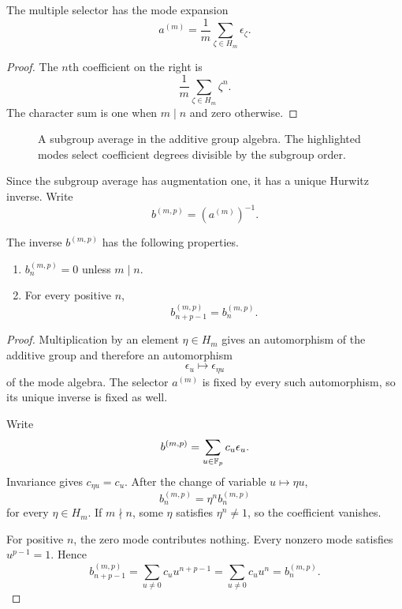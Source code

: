 \begin{histlemma}\label{hist:lem:subgroup_average}
The multiple selector has the mode expansion
\[
\boxed{
a^{(m)}
=
\frac1m
\sum_{\zeta\in H_m}
\epsilon_\zeta.
}
\]
\end{histlemma}

\begin{proof}
The \(n\)th coefficient on the right is
\[
\frac1m
\sum_{\zeta\in H_m}\zeta^n.
\]
The character sum is one when \(m\mid n\) and zero otherwise.
\end{proof}

\begin{figure}[t]
\centering
{}
\caption{A subgroup average in the additive group algebra. The highlighted modes select coefficient degrees divisible by the subgroup order.}
\label{hist:fig:subgroup_average}
\end{figure}

Since the subgroup average has augmentation one, it has a unique Hurwitz inverse. Write
\[
b^{(m,p)}
=
(a^{(m)})^{-1}.
\]

\begin{histtheorem}\label{hist:thm:support_period}
The inverse \(b^{(m,p)}\) has the following properties.
\begin{enumerate}
\item \(b_n^{(m,p)}=0\) unless \(m\mid n\).
\item For every positive \(n\),
\[
\boxed{
b_{n+p-1}^{(m,p)}
=
b_n^{(m,p)}.
}
\]
\end{enumerate}
\end{histtheorem}

\begin{proof}
Multiplication by an element \(\eta\in H_m\) gives an automorphism of the additive group and therefore an automorphism
\[
\epsilon_u\longmapsto\epsilon_{\eta u}
\]
of the mode algebra. The selector \(a^{(m)}\) is fixed by every such automorphism, so its unique inverse is fixed as well.

Write
\[
b^{(m,p)}
=
\sum_{u\in\mathbb F_p}c_u\epsilon_u.
\]
Invariance gives \(c_{\eta u}=c_u\). After the change of variable \(u\mapsto\eta u\),
\[
b_n^{(m,p)}
=
\eta^n b_n^{(m,p)}
\]
for every \(\eta\in H_m\). If \(m\nmid n\), some \(\eta\) satisfies \(\eta^n\neq1\), so the coefficient vanishes.

For positive \(n\), the zero mode contributes nothing. Every nonzero mode satisfies \(u^{p-1}=1\). Hence
\[
b_{n+p-1}^{(m,p)}
=
\sum_{u\neq0}c_uu^{n+p-1}
=
\sum_{u\neq0}c_uu^n
=
b_n^{(m,p)}.
\]
\end{proof}

